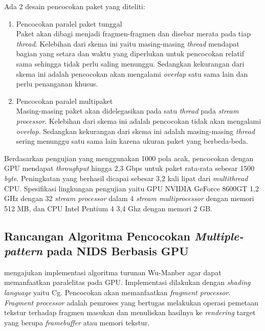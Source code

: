     Ada 2 desain pencocokan paket yang diteliti:
    \begin{enumerate}

      \item Pencocokan paralel paket tunggal \\
      Paket akan dibagi menjadi fragmen-fragmen dan disebar merata pada tiap \emph{thread}. Kelebihan dari skema ini yaitu masing-masing \emph{thread} mendapat bagian yang setara dan waktu yang diperlukan untuk pencocokan relatif sama sehingga tidak perlu saling menunggu. Sedangkan kekurangan dari skema ini adalah pencocokan akan mengalami \emph{overlap} satu sama lain dan perlu penanganan khusus.

      \item Pencocokan paralel multipaket \\
      Masing-masing paket akan didelegasikan pada satu \emph{thread} pada \emph{stream processor}. Kelebihan dari skema ini adalah pencocokan tidak akan mengalami \emph{overlap}. Sedangkan kekurangan dari skema ini adalah masing-masing \emph{thread} sering menunggu satu sama lain karena ukuran paket yang berbeda-beda.

    \end{enumerate}

    Berdasarkan pengujian yang menggunakan 1000 pola acak, pencocokan dengan GPU mendapat \emph{throughput} hingga 2,3 Gbps untuk paket rata-rata sebesar 1500 \emph{byte}. Peningkatan yang berhasil dicapai sebesar 3,2 kali lipat dari \emph{multithread} CPU. Spesifikasi lingkungan pengujian yaitu GPU NVIDIA GeForce 8600GT 1,2 GHz dengan 32 \emph{stream processor} dalam 4 \emph{stream multiprocessor} dengan memori 512 MB, dan CPU Intel Pentium 4 3,4 Ghz dengan memori 2 GB.

  \subsection{Rancangan Algoritma Pencocokan \emph{Multiple-pattern} pada NIDS Berbasis GPU}

    \cite{4482891} mengajukan implementasi algoritma turunan Wu-Manber agar dapat memanfaatkan paralelitas pada GPU. Implementasi dilakukan dengan \emph{shading language} yaitu Cg. Pencocokan akan memanfaatkan \emph{fragment processor}. \emph{Fragment processor} adalah pemroses yang bertugas melakukan operasi pemetaan tekstur terhadap fragmen masukan dan menuliskan hasilnya ke \emph{rendering} target yang berupa \emph{framebuffer} atau memori tekstur.

